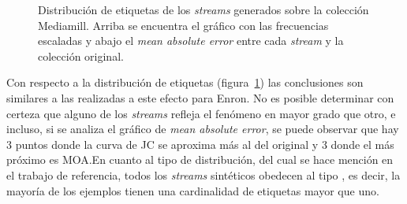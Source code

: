 \begin{figure}[htbp]
	\centering
	\vspace{1cm}
	\qquad
	\vspace{1cm}
	\caption[Distribución de etiquetas de los \textit{streams} generados sobre la colección
		Mediamill.]{Distribución de etiquetas de los \textit{streams} generados sobre la colección
		Mediamill. Arriba se encuentra el gráfico con las frecuencias escaladas y
		abajo el \textit{mean absolute error} entre cada \textit{stream} y la
		colección original.}
	\label{fig:syn_mediamill_label_distribution}
\end{figure}

Con respecto a la distribución de etiquetas
(figura~\ref{fig:syn_mediamill_label_distribution}) las conclusiones son
similares a las realizadas a este efecto para Enron. No es posible determinar
con certeza que alguno de los \textit{streams} refleja el fenómeno en mayor
grado que otro, e incluso, si se analiza el gráfico de \textit{mean absolute
	error}, se puede observar que hay 3 puntos donde la curva de JC se aproxima más
al del original y 3 donde el más próximo es MOA.\@ En cuanto al tipo de
distribución, del cual se hace mención en el trabajo de referencia, todos los
\textit{streams} sintéticos obedecen al tipo , es decir, la mayoría
de los ejemplos tienen una cardinalidad de etiquetas mayor que uno.


